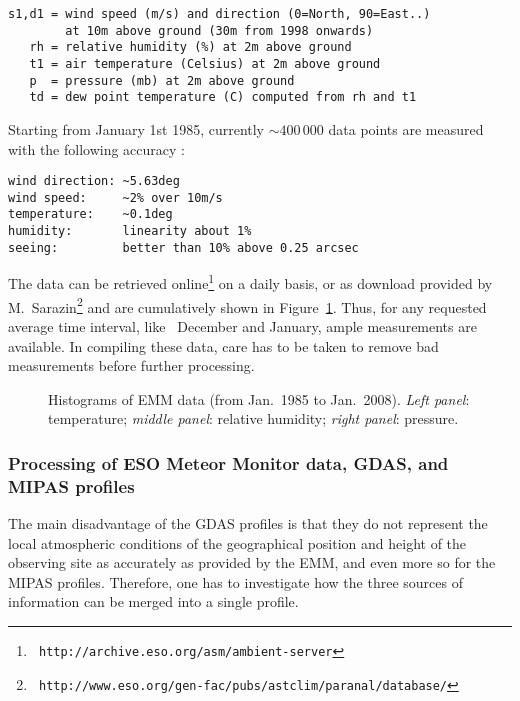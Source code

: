 \begin{verbatim}
s1,d1 = wind speed (m/s) and direction (0=North, 90=East..)
        at 10m above ground (30m from 1998 onwards)
   rh = relative humidity (%) at 2m above ground
   t1 = air temperature (Celsius) at 2m above ground
   p  = pressure (mb) at 2m above ground
   td = dew point temperature (C) computed from rh and t1
\end{verbatim}

Starting from January 1st 1985, currently $\sim 400\,000$ data points are
measured with the following accuracy \cite{meteomonitor}:

\begin{verbatim}
wind direction: ~5.63deg
wind speed:     ~2% over 10m/s
temperature:    ~0.1deg
humidity:       linearity about 1%
seeing:         better than 10% above 0.25 arcsec
\end{verbatim}

The data can be retrieved online\footnote{\tt
http://archive.eso.org/asm/ambient-server} on a daily basis, or as download
provided by M.~Sarazin\footnote{\tt
http://www.eso.org/gen-fac/pubs/astclim/paranal/database/} and are
cumulatively shown in Figure~\ref{fig:meteomonitor}. Thus, for any requested
average time interval, like \eg\ December and January, ample measurements are
available. In compiling these data, care has to be taken to remove bad
measurements before further processing.

\begin{figure}[ht]
  \begin{center}
    \caption{Histograms of \ac{EMM} data (from Jan.~1985 to Jan.~2008).
{\it Left panel}: temperature; {\it middle panel}: relative humidity;
{\it right panel}: pressure.}
    \label{fig:meteomonitor}
  \end{center}
\end{figure}

\clearpage

\subsubsection{Processing of ESO Meteor Monitor data, GDAS, and MIPAS profiles}
\label{sec:processing}
The main disadvantage of the \ac{GDAS} profiles is that they do not represent
the local atmospheric conditions of the geographical position and height of the
observing site as accurately as provided by the \ac{EMM}, and even more so for
the MIPAS profiles. Therefore, one has to investigate how the three sources of
information can be merged into a single profile.

